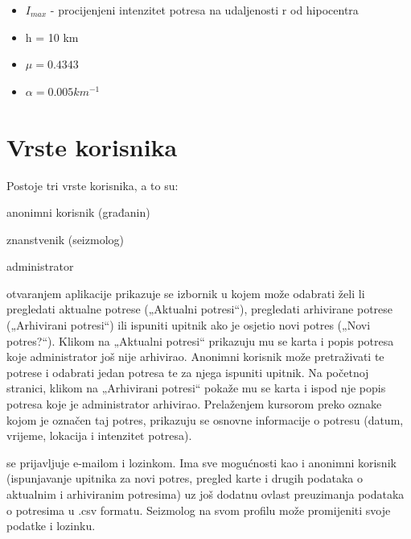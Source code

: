 \begin{itemize}                                                             
    \item $I_{max}$ - procijenjeni intenzitet potresa na udaljenosti r od hipocentra
    \item h = 10 km 
    \item $\mu=0.4343$
    \item $\alpha=0.005 km^{-1}$
    
\end{itemize} 


\section{Vrste korisnika}
Postoje tri vrste korisnika, a to su:
\begin{packed_item}
	\item anonimni korisnik (građanin)
	\item znanstvenik (seizmolog)
	\item administrator
\end{packed_item}

 otvaranjem aplikacije prikazuje se izbornik u kojem može odabrati želi li pregledati aktualne potrese („Aktualni potresi“), pregledati arhivirane potrese („Arhivirani potresi“) ili ispuniti upitnik ako je osjetio novi potres („Novi potres?“). Klikom na „Aktualni potresi“ prikazuju mu se karta i popis potresa koje administrator još nije arhivirao. Anonimni korisnik može pretraživati te potrese i odabrati jedan potresa te za njega ispuniti upitnik. Na početnoj stranici, klikom na „Arhivirani potresi“ pokaže mu se karta i ispod nje popis potresa koje je administrator arhivirao. Prelaženjem kursorom preko oznake kojom je označen taj potres, prikazuju se osnovne informacije o potresu (datum, vrijeme, lokacija i intenzitet potresa).

 se prijavljuje e-mailom i lozinkom. Ima sve mogućnosti kao i anonimni korisnik (ispunjavanje upitnika za novi potres, pregled karte i drugih podataka o aktualnim i arhiviranim potresima) uz još dodatnu ovlast preuzimanja podataka o potresima u .csv formatu. Seizmolog na svom profilu može promijeniti svoje podatke i lozinku.

